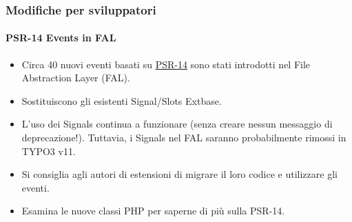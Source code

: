 
\begin{frame}[fragile]
	\frametitle{Modifiche per sviluppatori}
	\framesubtitle{PSR-14 Events in FAL}

	\lstset{basicstyle=\tiny\ttfamily}

	\begin{itemize}
		\item Circa 40 nuovi eventi basati su
			\href{https://www.php-fig.org/psr/psr-14/}{PSR-14}
			sono stati introdotti nel File Abstraction Layer (FAL).
		\item Sostituiscono gli esistenti Signal/Slots Extbase.
		\item L'uso dei Signals continua a funzionare (senza creare nessun messaggio di deprecazione!).
			Tuttavia, i Signals nel FAL saranno probabilmente rimossi in TYPO3 v11.
		\item Si consiglia agli autori di estensioni di migrare il loro codice e utilizzare gli eventi.
		\item Esamina le nuove classi PHP per saperne di più sulla PSR-14.
	\end{itemize}

\end{frame}



